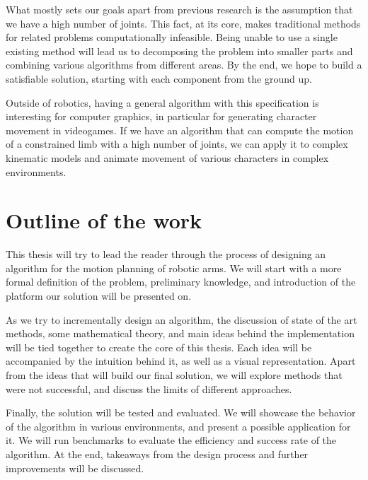 What mostly sets our goals apart from previous research is the assumption that we have a high number of joints. This fact, at its core, makes traditional methods for related problems computationally infeasible.
Being unable to use a single existing method will lead us to decomposing the problem into smaller parts and combining various algorithms from different areas. By the end, we hope to build a satisfiable solution, starting with each component from the ground up.

Outside of robotics, having a general algorithm with this specification is interesting for computer graphics, in particular for generating character movement in videogames.
If we have an algorithm that can compute the motion of a constrained limb with a high number of joints, we can apply it to complex kinematic models and animate movement of various characters in complex environments.

\section{Outline of the work}

This thesis will try to lead the reader through the process of designing an algorithm for the motion planning of robotic arms. We will start with a more formal definition of the problem, preliminary knowledge, and introduction of the platform our solution will be presented on.

As we try to incrementally design an algorithm, the discussion of state of the art methods, some mathematical theory, and main ideas behind the implementation will be tied together to create the core of this thesis. Each idea will be accompanied by the intuition behind it, as well as a visual representation. Apart from the ideas that will build our final solution, we will explore methods that were not successful, and discuss the limits of different approaches.

Finally, the solution will be tested and evaluated. We will showcase the behavior of the algorithm in various environments, and present a possible application for it. We will run benchmarks to evaluate the efficiency and success rate of the algorithm. At the end, takeaways from the design process and further improvements will be discussed.

